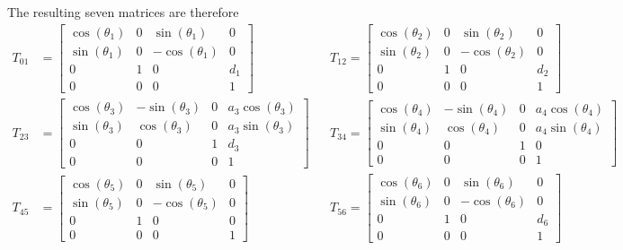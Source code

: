 \documentclass{article}
\begin{document}
The resulting seven matrices are therefore
\begin{align*}
T_{01} &=
\left[\begin{matrix}\cos{\left (\theta_{1} \right )} & 0 & \sin{\left (\theta_{1} \right )} & 0\\\sin{\left (\theta_{1} \right )} & 0 & - \cos{\left (\theta_{1} \right )} & 0\\0 & 1 & 0 & d_{1}\\0 & 0 & 0 & 1\end{matrix}\right]
&&T_{12} =
\left[\begin{matrix}\cos{\left (\theta_{2} \right )} & 0 & \sin{\left (\theta_{2} \right )} & 0\\\sin{\left (\theta_{2} \right )} & 0 & - \cos{\left (\theta_{2} \right )} & 0\\0 & 1 & 0 & d_{2}\\0 & 0 & 0 & 1\end{matrix}\right] \\
T_{23} &=
\left[\begin{matrix}\cos{\left (\theta_{3} \right )} & - \sin{\left (\theta_{3} \right )} & 0 & a_{3} \cos{\left (\theta_{3} \right )}\\\sin{\left (\theta_{3} \right )} & \cos{\left (\theta_{3} \right )} & 0 & a_{3} \sin{\left (\theta_{3} \right )}\\0 & 0 & 1 & d_{3}\\0 & 0 & 0 & 1\end{matrix}\right]
&&T_{34} =
\left[\begin{matrix}\cos{\left (\theta_{4} \right )} & - \sin{\left (\theta_{4} \right )} & 0 & a_{4} \cos{\left (\theta_{4} \right )}\\\sin{\left (\theta_{4} \right )} & \cos{\left (\theta_{4} \right )} & 0 & a_{4} \sin{\left (\theta_{4} \right )}\\0 & 0 & 1 & 0\\0 & 0 & 0 & 1\end{matrix}\right] \\
T_{45} &=
\left[\begin{matrix}\cos{\left (\theta_{5} \right )} & 0 & \sin{\left (\theta_{5} \right )} & 0\\\sin{\left (\theta_{5} \right )} & 0 & - \cos{\left (\theta_{5} \right )} & 0\\0 & 1 & 0 & 0\\0 & 0 & 0 & 1\end{matrix}\right]
&&T_{56} =
\left[\begin{matrix}\cos{\left (\theta_{6} \right )} & 0 & \sin{\left (\theta_{6} \right )} & 0\\\sin{\left (\theta_{6} \right )} & 0 & - \cos{\left (\theta_{6} \right )} & 0\\0 & 1 & 0 & d_{6}\\0 & 0 & 0 & 1\end{matrix}\right] \\

\end{align*}
\end{document}
